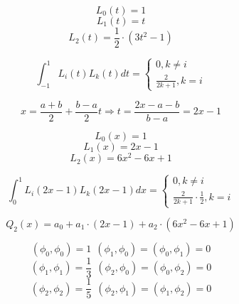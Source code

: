\begin{displaymath}
L_0(t) = 1
\end{displaymath}
\begin{displaymath}
L_1(t) = t
\end{displaymath}
\begin{displaymath}
L_2(t) = \frac{1}{2} \cdot (3t^2 - 1)
\end{displaymath}

\begin{displaymath}
\int_{-1}^{1} L_i(t) L_k(t) dt = \begin{cases} 0, k \neq i \\ \frac{2}{2k + 1}, k = i \end{cases}
\end{displaymath}

\begin{displaymath}
x = \frac{a + b}{2} + \frac{b - a}{2} t \Rightarrow t = \frac{2x - a - b}{b - a} = 2x - 1
\end{displaymath}

\begin{displaymath}
L_0(x) = 1
\end{displaymath}
\begin{displaymath}
L_1(x) = 2x - 1
\end{displaymath}
\begin{displaymath}
L_2(x) = 6x^2 - 6x + 1
\end{displaymath}

\begin{displaymath}
\int_0^1 L_i(2x - 1) L_k(2x - 1) dx = \begin{cases} 0, k \neq i \\ \frac{2}{2k + 1} \cdot \frac{1}{2}, k = i \end{cases}
\end{displaymath}

\begin{displaymath}
Q_2(x) = a_0 + a_1 \cdot (2x - 1) + a_2 \cdot (6x^2 - 6x + 1)
\end{displaymath}

\begin{displaymath}
(\phi_0, \phi_0) = 1 \ \ (\phi_1, \phi_0) = (\phi_0, \phi_1) = 0
\end{displaymath}
\begin{displaymath}
(\phi_1, \phi_1) = \frac{1}{3} \ \ (\phi_2, \phi_0) = (\phi_0, \phi_2) = 0
\end{displaymath}
\begin{displaymath}
(\phi_2, \phi_2) = \frac{1}{5} \ \ (\phi_2, \phi_1) = (\phi_1, \phi_2) = 0
\end{displaymath}

